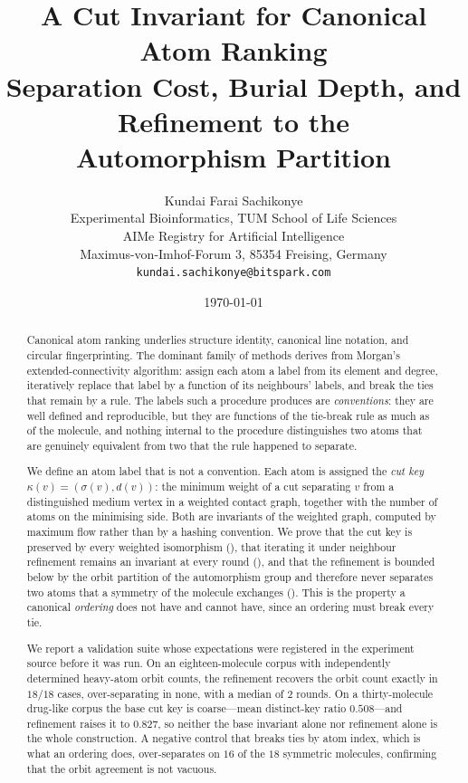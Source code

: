 \documentclass[11pt,twocolumn,a4paper]{article}
\title{\textbf{A Cut Invariant for Canonical Atom Ranking}\\[6pt]
\large Separation Cost, Burial Depth, and Refinement to the\\
Automorphism Partition}
\author{%
Kundai Farai Sachikonye\\[0.3em]
\normalsize Experimental Bioinformatics, TUM School of Life Sciences\\
\normalsize AIMe Registry for Artificial Intelligence \\
\normalsize Maximus-von-Imhof-Forum 3, 85354 Freising, Germany\\
\normalsize \texttt{kundai.sachikonye@bitspark.com}}
\date{\today}
\theoremstyle{crthm}
\theoremstyle{definition}
\theoremstyle{remark}
\newcommand{\sep}{\sigma}
\newcommand{\dep}{d}
\newcommand{\key}{\kappa}
\begin{document}
\maketitle

\tableofcontents

\begin{abstract}
\noindent
Canonical atom ranking underlies structure identity, canonical line
notation, and circular fingerprinting. The dominant family of methods
derives from Morgan's extended-connectivity algorithm: assign each atom a
label from its element and degree, iteratively replace that label by a
function of its neighbours' labels, and break the ties that remain by a
rule. The labels such a procedure produces are \emph{conventions}: they
are well defined and reproducible, but they are functions of the tie-break
rule as much as of the molecule, and nothing internal to the procedure
distinguishes two atoms that are genuinely equivalent from two that the
rule happened to separate.

We define an atom label that is not a convention. Each atom is assigned
the \emph{cut key} $\key(v)=(\sep(v),\dep(v))$: the minimum weight of a
cut separating $v$ from a distinguished medium vertex in a weighted
contact graph, together with the number of atoms on the minimising side.
Both are invariants of the weighted graph, computed by maximum flow rather
than by a hashing convention. We prove that the cut key is preserved by
every weighted isomorphism (), that iterating it
under neighbour refinement remains an invariant at every round
(), and that the refinement is bounded below by
the orbit partition of the automorphism group and therefore never
separates two atoms that a symmetry of the molecule exchanges
(). This is the property a canonical \emph{ordering}
does not have and cannot have, since an ordering must break every tie.

We report a validation suite whose expectations were registered in the
experiment source before it was run. On an eighteen-molecule corpus with
independently determined heavy-atom orbit counts, the refinement recovers
the orbit count exactly in $18/18$ cases, over-separating in none, with a
median of $2$ rounds. On a thirty-molecule drug-like corpus the base cut
key is coarse---mean distinct-key ratio $0.508$---and refinement raises it
to $0.827$, so neither the base invariant alone nor refinement alone is
the whole construction. A negative control that breaks ties by atom index,
which is what an ordering does, over-separates on $16$ of the $18$
symmetric molecules, confirming that the orbit agreement is not vacuous.


\end{abstract}
\end{document}
